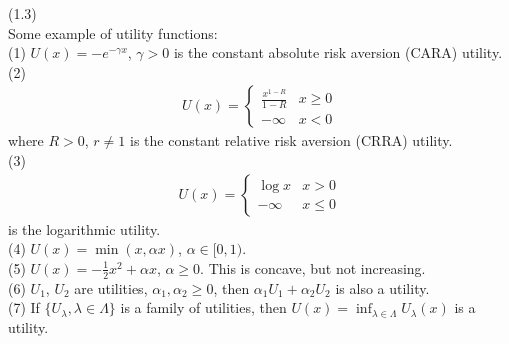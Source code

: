 \documentclass[a4paper]{article}
\begin{document}
\begin{eg}(1.3)\\
Some example of utility functions:\\
(1) $U(x) = -e^{-\gamma x}$, $\gamma>0$ is the constant absolute risk aversion (CARA) utility.\\
(2) 
\begin{equation*}
\begin{aligned}
U(x) = \left\{\begin{array}{ll}
\frac{x^{1-R}}{1-R} & x \geq 0\\
-\infty & x < 0
\end{array}
\right.
\end{aligned}
\end{equation*}
where $R>0$, $r \neq 1$ is the constant relative risk aversion (CRRA) utility.\\
(3) 
\begin{equation*}
\begin{aligned}
U(x) = \left\{\begin{array}{ll}
\log x & x > 0\\
-\infty & x \leq 0
\end{array}
\right.
\end{aligned}
\end{equation*}
is the logarithmic utility.\\
(4) $U(x) = \min(x,\alpha x)$, $\alpha \in [0,1)$.\\
(5) $U(x) = -\frac{1}{2} x^2 + \alpha x$, $\alpha \geq 0$. This is concave, but not increasing.\\
(6) $U_1$, $U_2$ are utilities, $\alpha_1,\alpha_2 \geq 0$, then $\alpha_1 U_1 + \alpha_2 U_2$ is also a utility.\\
(7) If $\{U_\lambda,\lambda \in \Lambda\}$ is a family of utilities, then $U(x) = \inf_{\lambda \in \Lambda} U_\lambda (x)$ is a utility.
\end{eg}
\end{document}
